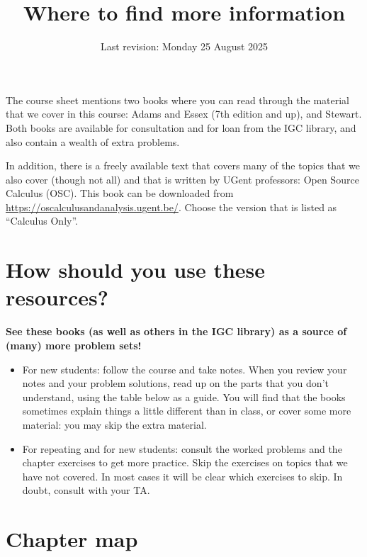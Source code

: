 \documentclass{article}
\title{Where to find more information}
\author{Last revision: Monday 25 August 2025}
\date{}
\begin{document}
\maketitle

The course sheet mentions two books where you can read through the material that we cover in this course: Adams and Essex (7th edition and up), and Stewart. Both books are available for consultation and for loan from the IGC library, and also contain a wealth of extra problems. 

In addition, there is a freely available text that covers many of the topics that we also cover (though not all) and that is written by UGent professors: Open Source Calculus (OSC). This book can be downloaded from \url{https://oscalculusandanalysis.ugent.be/}. Choose the version that is listed as ``Calculus Only''.			

\section*{How should you use these resources?}

\textbf{See these books (as well as others in the IGC library) as a source of (many) more problem sets!}

\begin{itemize}
\item For new students: follow the course and take notes. When you review your notes and your problem solutions, read up on the parts that you don't understand, using the table below as a guide. You will find that the books sometimes explain things a little different than in class, or cover some more material: you may skip the extra material.
\item For repeating and for new students: consult the worked problems and the chapter exercises to get more practice. Skip the exercises on topics that we have not covered. In most cases it will be clear which exercises to skip. In doubt, consult with your TA.
\end{itemize}

\section*{Chapter map}
\end{document}
